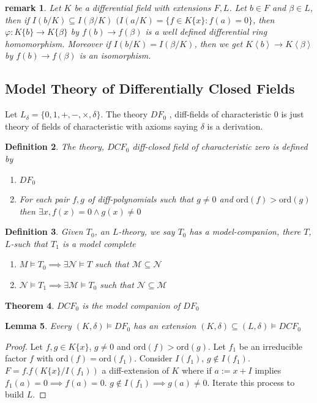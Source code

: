 \documentclass[letterpaper, 12pt]{article}
\newcommand{\fin}{\qquad \quad \hfill \framebox[1.75mm][l]{\,}}
\newcommand{\cM}{\mathcal{M}}
\newcommand{\cN}{\mathcal{N}}
\providecommand{\ip}[1]{\left\langle #1 \right\rangle}
\newcommand{\ord}{\mbox{ord}}
\theoremstyle{stdthm}
\newtheorem{thm}{Theorem}[section]
\newtheorem{lem}[thm]{Lemma}
\theoremstyle{stddef}
\newtheorem{defn}[thm]{Definition}
\newtheorem{rem}[thm]{remark} %
\theoremstyle{stdnonum}
\theoremstyle{stdqands}
\theoremstyle{stdbold}
\begin{document}
\begin{rem}
Let $K$ be a differential field with extensions $F,L$. Let $b \in F$ and $\beta \in L$, then if $I(b/K) \subseteq I(\beta/K)$ $(I(a/K) = \{f \in K\{x\} : f(a) = 0 \}$, then $\varphi: K\{b\} \to K\{\beta\}$ by $f(b) \to f(\beta)$ is a well defined differential ring homomorphism. Moreover if $I(b/K) = I(\beta/K)$, then we get $K\ip{b} \to K \ip{\beta}$ by $f(b) \to f(\beta)$ is an isomorphism. 
\end{rem}

\subsection*{Model Theory of Differentially Closed Fields}
Let $L_\delta = \{0,1,+,-,\times, \delta \}$. The theory $DF_0$ , diff-fields of characteristic 0 is just theory of fields of characteristic with axioms saying $\delta$ is a derivation. 

\begin{defn}
The theory, $DCF_0$ diff-closed field of characteristic zero is defined by 
\begin{enumerate}
\item $DF_0$ 
\item For each pair $f,g$ of diff-polynomials such that $g \neq 0$ and $\ord(f) > \ord(g)$ then $\exists x, f(x) = 0 \wedge g(x) \neq 0 $ 
\end{enumerate}
\end{defn}

\begin{defn}
Given $T_0$, an $L$-theory, we say $T_0$ has a model-companion, there $T$, $L$-such that $T_1$ is a model complete 
\begin{enumerate}
\item $M \models T_0 \implies \exists \cN \models T$ such that $\cM \subseteq \cN$ 
\item $\cN \models T_1 \implies \exists \cM \models T_0 $ such that $\cN \subseteq \cM$ 
\end{enumerate}
\end{defn}

\begin{thm}
$DCF_0$ is the model companion of $DF_0$ 
\end{thm}

\begin{lem}
Every $(K,\delta) \models DF_0$ has an extension $(K,\delta) \subseteq (L,\delta) \models DCF_0$
\end{lem}
\begin{proof}
Let $f,g \in K\{x\}$, $g \neq 0$ and $\ord(f) > \ord(g)$. Let $f_1$ be an irreducible factor $f$ with $\ord(f) = \ord(f_1)$.  Consider $I(f_1)$, $g \notin I(f_1)$. $F =f.f (K\{x\} /I(f_1))$ a diff-extension of $K$ where if $a:= x + I$ implies $f_1(a) = 0 \implies f(a) = 0$. $g \notin I(f_1) \implies g(a) \neq 0$. Iterate this process to build $L$. 

\end{proof}
\end{document}
